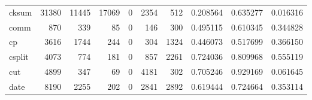 \begin{longtable}{lrrrrrrrrr}
cksum     &                                              31380 &                                              11445 &                                              17069 &                                                  0 &                                               2354 &                                                512 &                                           0.208564 &                               0.635277 &                             0.016316 \\
comm      &                                                870 &                                                339 &                                                 85 &                                                  0 &                                                146 &                                                300 &                                           0.495115 &                               0.610345 &                             0.344828 \\
cp        &                                               3616 &                                               1744 &                                                244 &                                                  0 &                                                304 &                                               1324 &                                           0.446073 &                               0.517699 &                             0.366150 \\
csplit    &                                               4073 &                                                774 &                                                181 &                                                  0 &                                                857 &                                               2261 &                                           0.724036 &                               0.809968 &                             0.555119 \\
cut       &                                               4899 &                                                347 &                                                 69 &                                                  0 &                                               4181 &                                                302 &                                           0.705246 &                               0.929169 &                             0.061645 \\
date      &                                               8190 &                                               2255 &                                                202 &                                                  0 &                                               2841 &                                               2892 &                                           0.619444 &                               0.724664 &                             0.353114 \\

\end{longtable}
